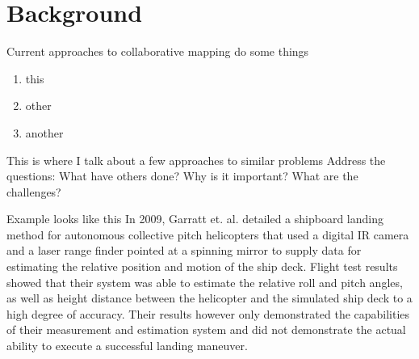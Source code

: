 \documentclass[12pt, letterpaper]{article}
\begin{document}
\section{Background}



Current approaches to collaborative mapping do some things 

\begin{enumerate}
\item this
\item other
\item another

\end{enumerate}


This is where I talk about a few approaches to similar problems
Address the questions: What have others done? Why is it important? What are the challenges?  

Example looks like this In 2009, Garratt et. al. \cite{Garratt2009} detailed a shipboard landing method for autonomous collective pitch helicopters that used a digital IR camera and a laser range finder pointed at a spinning mirror to supply data for estimating the relative position and motion of the ship deck.  Flight test results showed that their system was able to estimate the relative roll and pitch angles, as well as height distance between the helicopter and the simulated ship deck to a high degree of accuracy.  Their results however only demonstrated the capabilities of their measurement and estimation system and did not demonstrate the actual ability to execute a successful landing maneuver.  

\end{document}
